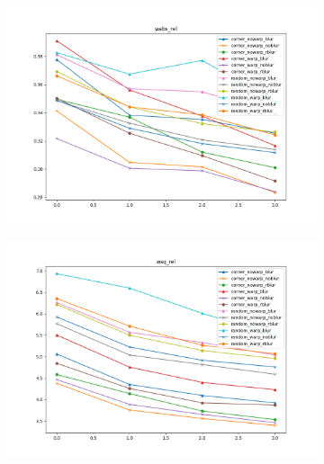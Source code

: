 \begin{figure}
    \begin{adjustwidth}{-0.2\textwidth}{-0.2\textwidth}
    \centering
        \begin{subfigure}{0.6\textwidth}
            \includegraphics[width=\textwidth]{figs/wabs_rel}
        \end{subfigure}
        \hspace{0cm}
        \begin{subfigure}{0.6\textwidth}
            \includegraphics[width=\textwidth]{figs/wsq_rel}
        \end{subfigure}
        \hspace{0cm}


\end{adjustwidth}
\end{figure}

